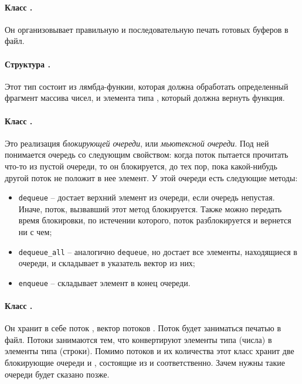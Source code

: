 \documentclass[a4paper, 12pt, twoside]{article}
\begin{document}
\paragraph{Класс \texttt{}.}
Он организовывает правильную и последовательную печать готовых буферов в файл. 
\paragraph{Структура \texttt{}.}
Этот тип состоит из лямбда-функии, которая должна обработать определенный фрагмент массива чисел, и элемента типа \texttt{}, который должна вернуть функция.
\paragraph{Класс \texttt{}.}
Это реализация \textit{блокирующей очереди}, или \textit{мьютексной очереди}.  
Под ней понимается очередь со следующим свойством: когда поток пытается прочитать что-то из пустой очереди, то он блокируется, до тех пор, пока какой-нибудь другой поток не положит в нее элемент.
У этой очереди есть следующие методы:
\begin{itemize}
\item \texttt{dequeue} -- достает верхний элемент из очереди, если очередь непустая.
Иначе, поток, вызвавший этот метод блокируется. Также можно передать время блокировки, по истечении которого, поток разблокируется и вернется ни с чем;
\item \texttt{dequeue\_all} -- аналогично \texttt{dequeue}, но достает все элементы, находящиеся в очереди, и складывает в указатель вектор из них;
\item \texttt{enqueue} -- складывает элемент в конец очереди.
\end{itemize}
\paragraph{Класс \texttt{}.} 
Он хранит в себе поток \texttt{}, вектор потоков \texttt{}.
Поток \texttt{} будет заниматься печатью в файл.
Потоки \texttt{} занимаются тем, что конвертируют элементы типа \texttt{} (числа) в элементы типа \texttt{} (строки).
Помимо потоков и их количества этот класс хранит две блокирующие очереди \texttt{} и \texttt{}, состоящие из \texttt{} и \texttt{} соответственно. 
Зачем нужны такие очереди будет сказано позже.
\end{document}

